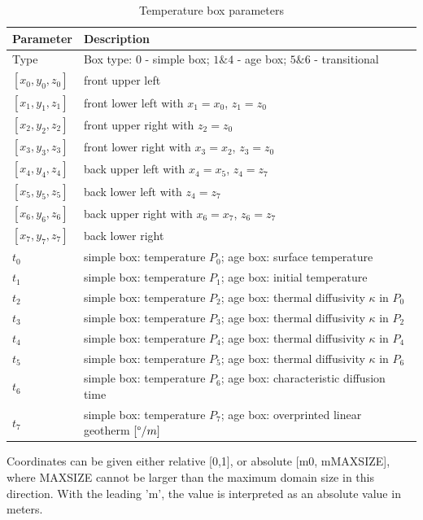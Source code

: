 \begin{table}[H]
	\centering
	\begin{tabular}{l l}
		\toprule
		Parameter		& Description\\
		\midrule
		Type			& Box type: $0$ - simple box; $1\&4$ - age box; $5\&6$ - transitional\\
		$[x_0,y_0,z_0]$ & front upper left\\
		$[x_1,y_1,z_1]$ & front lower left with $x_1=x_0$, $z_1=z_0$\\
		$[x_2,y_2,z_2]$ & front upper right with $z_2=z_0$\\ 
		$[x_3,y_3,z_3]$ & front lower right with $x_3=x_2$, $z_3=z_0$\\ 
		$[x_4,y_4,z_4]$ & back upper left with $x_4=x_5$, $z_4=z_7$\\  
		$[x_5,y_5,z_5]$ & back lower left with $z_4=z_7$\\ 
		$[x_6,y_6,z_6]$ & back upper right with $x_6=x_7$, $z_6=z_7$\\
		$[x_7,y_7,z_7]$ & back lower right\\
		$t_0$ & simple box: temperature $P_0$; age box: surface temperature\\
		$t_1$ & simple box: temperature $P_1$; age box: initial temperature\\
		$t_2$ & simple box: temperature $P_2$; age box: thermal diffusivity $\kappa$ in $P_0$\\
		$t_3$ & simple box: temperature $P_3$; age box: thermal diffusivity $\kappa$ in $P_2$\\
		$t_4$ & simple box: temperature $P_4$; age box: thermal diffusivity $\kappa$ in $P_4$\\
		$t_5$ & simple box: temperature $P_5$; age box: thermal diffusivity $\kappa$ in $P_6$\\
		$t_6$ & simple box: temperature $P_6$; age box: characteristic diffusion time\\
		$t_7$ & simple box: temperature $P_7$; age box: overprinted linear geotherm $[\degree/m]$\\
		\bottomrule
	\end{tabular}
	\caption{Temperature box parameters}
	\label{tbl:t_box_parameters}
\end{table}

Coordinates can be given either relative [0,1], or absolute [m0, mMAXSIZE], where MAXSIZE cannot be larger than the maximum domain size in this direction. With the leading 'm', the value is interpreted as an absolute value in meters.

